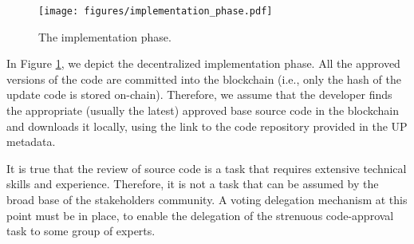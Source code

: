 \begin{figure}[h!] %
    \caption{The implementation phase.}
    \centering
    \texttt{[image: figures/implementation\_phase.pdf]}
    \label{implementation}
\end{figure}


In Figure \ref{implementation}, we depict the decentralized implementation phase. All the approved versions of the code are committed into the blockchain (i.e., only the hash of the update code is stored on-chain). Therefore, we assume that the developer finds the appropriate (usually the latest) approved base source code in the blockchain and downloads it locally, using the link to the %
 code repository provided in the UP metadata. %

It is true that the review of source code is a task that requires extensive technical skills and experience. Therefore, it is not a task that can be assumed by the broad base of the stakeholders community. A voting delegation mechanism at this point must be in place, to enable the delegation of the strenuous code-approval task to some group of experts. 

